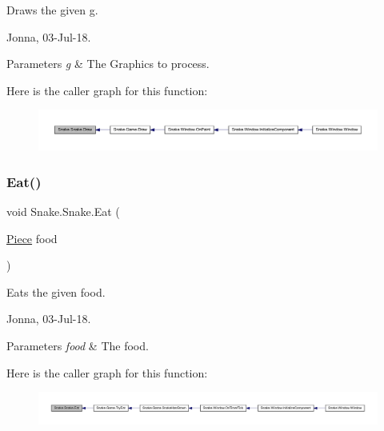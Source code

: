 Draws the given g. 

Jonna, 03-\/\+Jul-\/18. 


\begin{DoxyParams}{Parameters}
{\em g} & The Graphics to process. \\
\hline
\end{DoxyParams}
Here is the caller graph for this function\+:
\nopagebreak
\begin{figure}[H]
\begin{center}
\leavevmode
\includegraphics[width=350pt]{dd/d78/class_snake_1_1_snake_ae1a73925b1a95fb087c26d87fe16a79f_icgraph}
\end{center}
\end{figure}
\mbox{\label{class_snake_1_1_snake_a68e6b4ee9071abc4f25805d920785a19}} 
\subsubsection{\texorpdfstring{Eat()}{Eat()}}
{\footnotesize\ttfamily void Snake.\+Snake.\+Eat (\begin{DoxyParamCaption}\item[{\mbox{\hyperlink{class_snake_1_1_piece}{Piece}}}]{food }\end{DoxyParamCaption})}



Eats the given food. 

Jonna, 03-\/\+Jul-\/18. 


\begin{DoxyParams}{Parameters}
{\em food} & The food. \\
\hline
\end{DoxyParams}
Here is the caller graph for this function\+:
\nopagebreak
\begin{figure}[H]
\begin{center}
\leavevmode
\includegraphics[width=350pt]{dd/d78/class_snake_1_1_snake_a68e6b4ee9071abc4f25805d920785a19_icgraph}
\end{center}
\end{figure}
\mbox{\label{class_snake_1_1_snake_a1b5785fedc244882f02fa9145141c432}} 
